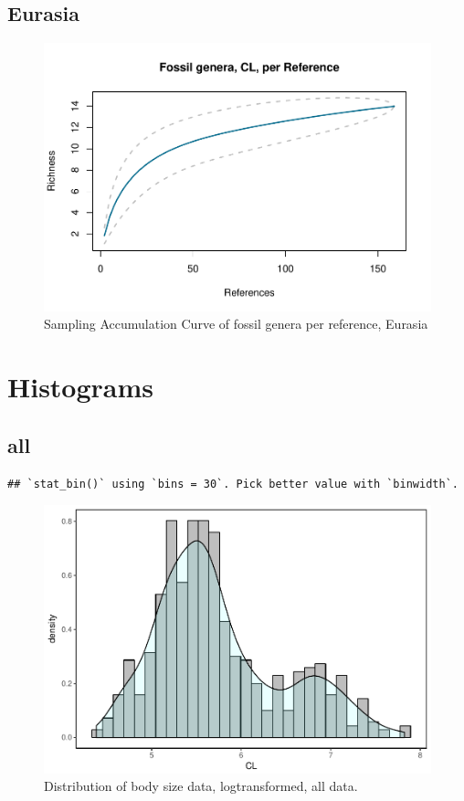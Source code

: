 \documentclass[]{article}
\begin{document}
\subsection{Eurasia}\label{eurasia}

\begin{figure}[htbp]
\centering
\includegraphics{MA_JJ_files/figure-latex/Species Accumulation Curve with Genera, Eurasia-1.pdf}
\caption{Sampling Accumulation Curve of fossil genera per reference,
Eurasia}
\end{figure}

\newpage

\section{Histograms}\label{histograms}

\subsection{all}\label{all}

\begin{verbatim}
## `stat_bin()` using `bins = 30`. Pick better value with `binwidth`.
\end{verbatim}

\begin{figure}[htbp]
\centering
\includegraphics{MA_JJ_files/figure-latex/Histograms of body size data, all-1.pdf}
\caption{Distribution of body size data, logtransformed, all data.}
\end{figure}
\end{document}
